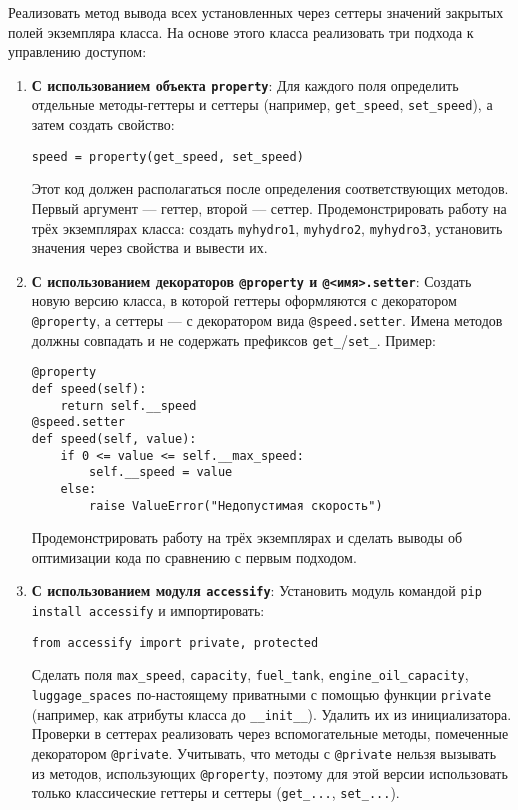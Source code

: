 \begin{enumerate}
\begin{itemize}
\end{itemize}
Реализовать метод вывода всех установленных через сеттеры значений закрытых полей экземпляра класса.
На основе этого класса реализовать три подхода к управлению доступом:
\begin{enumerate}
    \item \textbf{С использованием объекта \texttt{property}}:  
    Для каждого поля определить отдельные методы-геттеры и сеттеры (например, \texttt{get\_speed}, \texttt{set\_speed}), а затем создать свойство:  
    \begin{verbatim}
speed = property(get_speed, set_speed)
    \end{verbatim}  
    Этот код должен располагаться после определения соответствующих методов. Первый аргумент — геттер, второй — сеттер.  
    Продемонстрировать работу на трёх экземплярах класса: создать \texttt{myhydro1}, \texttt{myhydro2}, \texttt{myhydro3}, установить значения через свойства и вывести их.
    \item \textbf{С использованием декораторов \texttt{@property} и \texttt{@<имя>.setter}}:  
    Создать новую версию класса, в которой геттеры оформляются с декоратором \texttt{@property}, а сеттеры — с декоратором вида \texttt{@speed.setter}. Имена методов должны совпадать и не содержать префиксов \texttt{get\_}/\texttt{set\_}.  
    Пример:  
    \begin{verbatim}
@property
def speed(self):
    return self.__speed
@speed.setter
def speed(self, value):
    if 0 <= value <= self.__max_speed:
        self.__speed = value
    else:
        raise ValueError("Недопустимая скорость")
    \end{verbatim}  
    Продемонстрировать работу на трёх экземплярах и сделать выводы об оптимизации кода по сравнению с первым подходом.
    \item \textbf{С использованием модуля \texttt{accessify}}:  
    Установить модуль командой \texttt{pip install accessify} и импортировать:  
    \begin{verbatim}
from accessify import private, protected
    \end{verbatim}  
    Сделать поля \texttt{max\_speed}, \texttt{capacity}, \texttt{fuel\_tank}, \texttt{engine\_oil\_capacity}, \texttt{luggage\_spaces} по-настоящему приватными с помощью функции \texttt{private} (например, как атрибуты класса до \texttt{\_\_init\_\_}). Удалить их из инициализатора.  
    Проверки в сеттерах реализовать через вспомогательные методы, помеченные декоратором \texttt{@private}.  
    Учитывать, что методы с \texttt{@private} нельзя вызывать из методов, использующих \texttt{@property}, поэтому для этой версии использовать только классические геттеры и сеттеры (\texttt{get\_...}, \texttt{set\_...}).  

\end{enumerate}
\end{enumerate}
